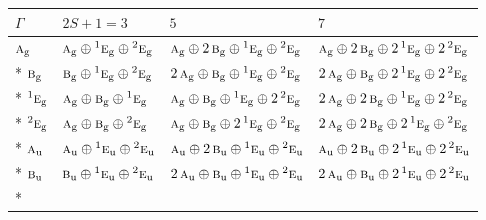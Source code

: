 \documentclass[10pt,a4paper]{article}
\numberwithin{equation}{section}
\newcommand{\irr}[1]{\text{\normalfont\scshape #1}}
\newcommand{\conjpair}[1]{{}^{#1}}
\newcommand{\ptag}[1]{\mathrm{#1}}
\begin{document}
{\small\setlength{\tabcolsep}{3pt}\begin{longtable}{@{}llll@{}}\toprule
$\Gamma$ & $2S + 1 = 3$ & $5$ & $7$\\\midrule\endhead
\bottomrule\endfoot\endlastfoot
$\irr{a}_{\ptag{g}}$ & $\irr{a}_{\ptag{g}}\oplus \conjpair{1}\irr{e}_{\ptag{g}}\oplus \conjpair{2}\irr{e}_{\ptag{g}}$ & $\irr{a}_{\ptag{g}}\oplus 2\,\irr{b}_{\ptag{g}}\oplus \conjpair{1}\irr{e}_{\ptag{g}}\oplus \conjpair{2}\irr{e}_{\ptag{g}}$ & $\irr{a}_{\ptag{g}}\oplus 2\,\irr{b}_{\ptag{g}}\oplus 2\,\conjpair{1}\irr{e}_{\ptag{g}}\oplus 2\,\conjpair{2}\irr{e}_{\ptag{g}}$\\*
$\irr{b}_{\ptag{g}}$ & $\irr{b}_{\ptag{g}}\oplus \conjpair{1}\irr{e}_{\ptag{g}}\oplus \conjpair{2}\irr{e}_{\ptag{g}}$ & $2\,\irr{a}_{\ptag{g}}\oplus \irr{b}_{\ptag{g}}\oplus \conjpair{1}\irr{e}_{\ptag{g}}\oplus \conjpair{2}\irr{e}_{\ptag{g}}$ & $2\,\irr{a}_{\ptag{g}}\oplus \irr{b}_{\ptag{g}}\oplus 2\,\conjpair{1}\irr{e}_{\ptag{g}}\oplus 2\,\conjpair{2}\irr{e}_{\ptag{g}}$\\*
$\conjpair{1}\irr{e}_{\ptag{g}}$ & $\irr{a}_{\ptag{g}}\oplus \irr{b}_{\ptag{g}}\oplus \conjpair{1}\irr{e}_{\ptag{g}}$ & $\irr{a}_{\ptag{g}}\oplus \irr{b}_{\ptag{g}}\oplus \conjpair{1}\irr{e}_{\ptag{g}}\oplus 2\,\conjpair{2}\irr{e}_{\ptag{g}}$ & $2\,\irr{a}_{\ptag{g}}\oplus 2\,\irr{b}_{\ptag{g}}\oplus \conjpair{1}\irr{e}_{\ptag{g}}\oplus 2\,\conjpair{2}\irr{e}_{\ptag{g}}$\\*
$\conjpair{2}\irr{e}_{\ptag{g}}$ & $\irr{a}_{\ptag{g}}\oplus \irr{b}_{\ptag{g}}\oplus \conjpair{2}\irr{e}_{\ptag{g}}$ & $\irr{a}_{\ptag{g}}\oplus \irr{b}_{\ptag{g}}\oplus 2\,\conjpair{1}\irr{e}_{\ptag{g}}\oplus \conjpair{2}\irr{e}_{\ptag{g}}$ & $2\,\irr{a}_{\ptag{g}}\oplus 2\,\irr{b}_{\ptag{g}}\oplus 2\,\conjpair{1}\irr{e}_{\ptag{g}}\oplus \conjpair{2}\irr{e}_{\ptag{g}}$\\*
$\irr{a}_{\ptag{u}}$ & $\irr{a}_{\ptag{u}}\oplus \conjpair{1}\irr{e}_{\ptag{u}}\oplus \conjpair{2}\irr{e}_{\ptag{u}}$ & $\irr{a}_{\ptag{u}}\oplus 2\,\irr{b}_{\ptag{u}}\oplus \conjpair{1}\irr{e}_{\ptag{u}}\oplus \conjpair{2}\irr{e}_{\ptag{u}}$ & $\irr{a}_{\ptag{u}}\oplus 2\,\irr{b}_{\ptag{u}}\oplus 2\,\conjpair{1}\irr{e}_{\ptag{u}}\oplus 2\,\conjpair{2}\irr{e}_{\ptag{u}}$\\*
$\irr{b}_{\ptag{u}}$ & $\irr{b}_{\ptag{u}}\oplus \conjpair{1}\irr{e}_{\ptag{u}}\oplus \conjpair{2}\irr{e}_{\ptag{u}}$ & $2\,\irr{a}_{\ptag{u}}\oplus \irr{b}_{\ptag{u}}\oplus \conjpair{1}\irr{e}_{\ptag{u}}\oplus \conjpair{2}\irr{e}_{\ptag{u}}$ & $2\,\irr{a}_{\ptag{u}}\oplus \irr{b}_{\ptag{u}}\oplus 2\,\conjpair{1}\irr{e}_{\ptag{u}}\oplus 2\,\conjpair{2}\irr{e}_{\ptag{u}}$\\*

\end{longtable}}
\end{document}
